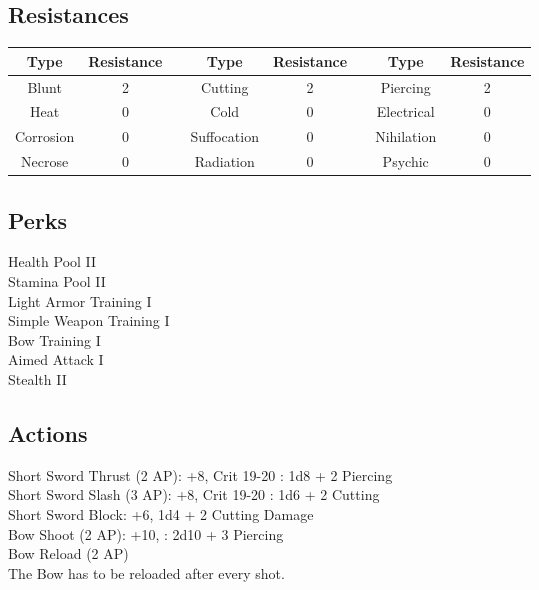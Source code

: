 \subsection{Resistances}
\begin{minipage}[H]{1\textwidth}
	\centering
	\begin{tabular}[c]{|c | c | c | c | c | c | c | c|}
		\hline
		Type & Resistance && Type & Resistance && Type & Resistance\\
		\hline
		Blunt & 2 &&
		Cutting & 2 &&
		Piercing & 2\\
		Heat & 0 &&
		Cold & 0 &&
		Electrical & 0\\
		Corrosion & 0 &&
		Suffocation & 0 &&
		Nihilation & 0 \\
		Necrose & 0 &&
		Radiation & 0 &&
		Psychic & 0\\
		\hline
	\end{tabular}
\end{minipage}

\subsection{Perks}
Health Pool II\\
Stamina Pool II\\
Light Armor Training I\\
Simple Weapon Training I\\
Bow Training I\\
Aimed Attack I\\
Stealth II\\

\subsection{Actions}
Short Sword Thrust (2 AP): +8, Crit 19-20 : 1d8 + 2 Piercing\\

Short Sword Slash (3 AP): +8, Crit 19-20 : 1d6 + 2 Cutting\\

Short Sword Block: +6, 1d4 + 2 Cutting Damage\\

Bow Shoot (2 AP): +10, : 2d10 + 3 Piercing\\

Bow Reload (2 AP)\\
The Bow has to be reloaded after every shot.

